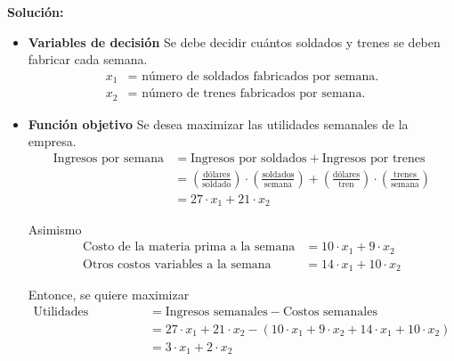 \documentclass[../main.tex]{subfiles}
\begin{document}
\begin{example}
        \textbf{Solución:}
        \begin{itemize}
            \item \textbf{Variables de decisión} 
                Se debe decidir cuántos soldados y trenes se deben fabricar cada semana. 
                \begin{equation}
                    \begin{split}
                        x_1 &= \text{ número de soldados fabricados por semana.}\\
                        x_2 &= \text{ número de trenes fabricados por semana.}
                    \end{split}
                \end{equation}
            \item \textbf{Función objetivo}
                Se desea maximizar las utilidades semanales de la empresa. 
                \begin{equation}
                    \begin{split}
                        \text{Ingresos por semana} &= \text{Ingresos por soldados} + \text{Ingresos por trenes} \\
                        &= \left(\frac{\text{dólares}}{\text{soldado}}\right) \cdot \left(\frac{\text{soldados}}{\text{semana}}\right) + \left(\frac{\text{dólares}}{\text{tren}}\right) \cdot \left(\frac{\text{trenes}}{\text{semana}}\right)  \\
                        &= 27 \cdot x_1 + 21 \cdot x_2
                    \end{split}
                \end{equation}

                Asimismo
                \begin{equation}
                    \begin{split}
                        \text{Costo de la materia prima a la semana} &= 10 \cdot x_1 + 9 \cdot x_2 \\
                        \text{Otros costos variables a la semana} &= 14 \cdot x_1 + 10 \cdot x_2
                    \end{split}
                \end{equation}

                Entonce, se quiere maximizar
                \begin{equation}
                    \begin{split}
                        \text{Utilidades semanales} &= \text{Ingresos semanales} - \text{Costos semanales} \\
                        &= 27 \cdot x_1 + 21 \cdot x_2 - (10 \cdot x_1 + 9 \cdot x_2 + 14 \cdot x_1 + 10 \cdot x_2) \\
                        &= 3 \cdot x_1 + 2 \cdot x_2
                    \end{split}
                \end{equation}


\end{itemize}
\end{example}
\end{document}
